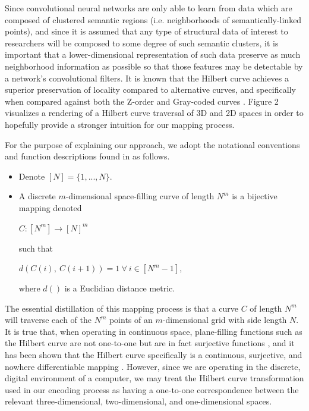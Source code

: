 \documentclass{article}
\begin{document}
Since convolutional neural networks are only able to learn from data which are composed of clustered semantic regions (i.e. neighborhoods of semantically-linked points), and since it is assumed that any type of structural data of interest to researchers will be composed to some degree of such semantic clusters, it is important that a lower-dimensional representation of such data preserve as much neighborhood information as possible so that those features may be detectable by a network's convolutional filters. It is known that the Hilbert curve achieves a superior preservation of locality compared to alternative curves, and specifically when compared against both the Z-order and Gray-coded curves \cite{moon01} \cite{lindenbaum96}. Figure 2 visualizes a rendering of a Hilbert curve traversal of 3D and 2D spaces in order to hopefully provide a stronger intuition for our mapping process.

For the purpose of explaining our approach, we adopt the notational conventions and function descriptions found in \cite{lindenbaum96} as follows. 

\begin{itemize}
    \item Denote $[N]=\{1,...,N\}$. 
    \item A discrete $m$-dimensional space-filling curve of length $N^m$ is a bijective mapping denoted
    \begin{center}
    $C:[N^m] \rightarrow [N]^m$
    \end{center}
    such that 
    \begin{center}
    $d(C(i),\ C(i+1))=1\ \forall\ i \in [N^m - 1]$,    
    \end{center}
    where $d()$ is a Euclidian distance metric. 
\end{itemize}

The essential distillation of this mapping process is that a curve $C$ of length $N^m$ will traverse each of the $N^m$ points of an $m$-dimensional grid with side length $N$. It is true that, when operating in continuous space, plane-filling functions such as the Hilbert curve are not one-to-one but are in fact surjective functions \cite{tarver14}, and it has been shown that the Hilbert curve specifically is a continuous, surjective, and nowhere differentiable mapping \cite{sagan93}. However, since we are operating in the discrete, digital environment of a computer, we may treat the Hilbert curve transformation used in our encoding process as having a one-to-one correspondence between the relevant three-dimensional, two-dimensional, and one-dimensional spaces. 
\end{document}
